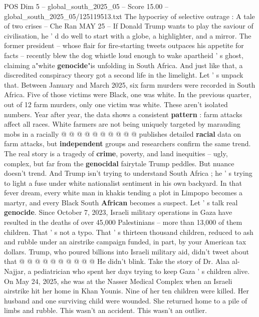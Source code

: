 \begin{textsample}{POS Dim 5 – global\_south\_2025\_05 – Score 15.00 – global\_south\_2025\_05/125119513.txt}  \label{ex:f5_pos_120}
The hypocrisy of selective outrage : A tale of two crises -- Che Ran MAY 25 -- If Donald Trump wants to play the saviour of civilisation, he ' d do well to start with a globe, a highlighter, and a mirror.
The former president -- whose flair for fire-starting tweets outpaces his appetite for facts -- recently blew the dog whistle loud enough to wake apartheid ' s ghost, claiming a"white \textbf{genocide}"is unfolding in South Africa.
And just like that, a discredited conspiracy theory got a second life in the limelight.
Let ' s unpack that.
Between January and March 2025, six farm murders were recorded in South Africa.
Five of those victims were Black, one was white.
In the previous quarter, out of 12 farm murders, only one victim was white.
These aren't isolated numbers.
Year after year, the data shows a consistent \textbf{pattern} : farm attacks affect all races.
White farmers are not being uniquely targeted by marauding mobs in a racially @ @ @ @ @ @ @ @ @ @ publishes detailed \textbf{racial} data on farm attacks, but \textbf{independent} groups and researchers confirm the same trend.
The real story is a tragedy of \textbf{crime}, poverty, and land inequities -- ugly, complex, but far from the \textbf{genocidal} fairytale Trump peddles.
But nuance doesn't trend.
And Trump isn't trying to understand South Africa ; he ' s trying to light a fuse under white nationalist sentiment in his own backyard.
In that fever dream, every white man in khakis tending a plot in Limpopo becomes a martyr, and every Black South \textbf{African} becomes a suspect.
Let ' s talk real \textbf{genocide}.
Since October 7, 2023, Israeli military operations in Gaza have resulted in the deaths of over 45,000 Palestinians -- more than 13,000 of them children.
That ' s not a typo.
That ' s thirteen thousand children, reduced to ash and rubble under an airstrike campaign funded, in part, by your American tax dollars.
Trump, who poured billions into Israeli military aid, didn't tweet about that @ @ @ @ @ @ @ @ @ @ He didn't blink.
Take the story of Dr.
Alaa al-Najjar, a pediatrician who spent her days trying to keep Gaza ' s children alive.
On May 24, 2025, she was at the Nasser Medical Complex when an Israeli airstrike hit her home in Khan Younis.
Nine of her ten children were killed.
Her husband and one surviving child were wounded.
She returned home to a pile of limbs and rubble.
This wasn't an accident.
This wasn't an outlier.

\end{textsample}
